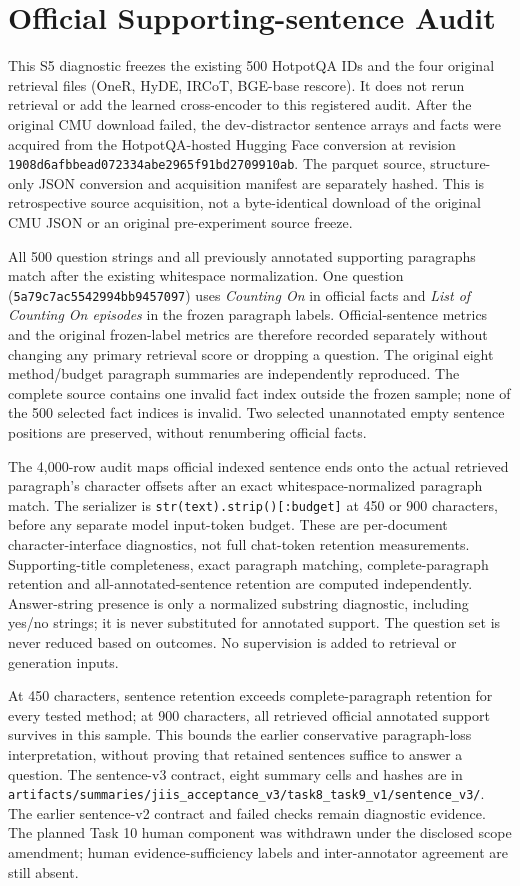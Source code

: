 \documentclass[pdflatex,sn-basic,Numbered]{sn-jnl}
\begin{document}
\section{Official Supporting-sentence Audit}
\label{sec:supp_sentence_audit}
This S5 diagnostic freezes the existing 500 HotpotQA IDs and the four original retrieval files (OneR, HyDE, IRCoT, BGE-base rescore). It does not rerun retrieval or add the learned cross-encoder to this registered audit. After the original CMU download failed, the dev-distractor sentence arrays and facts were acquired from the HotpotQA-hosted Hugging Face conversion at revision \texttt{1908d6afbbead072334abe2965f91bd2709910ab}. The parquet source, structure-only JSON conversion and acquisition manifest are separately hashed. This is retrospective source acquisition, not a byte-identical download of the original CMU JSON or an original pre-experiment source freeze.

All 500 question strings and all previously annotated supporting paragraphs match after the existing whitespace normalization. One question (\texttt{5a79c7ac5542994bb9457097}) uses \emph{Counting On} in official facts and \emph{List of Counting On episodes} in the frozen paragraph labels. Official-sentence metrics and the original frozen-label metrics are therefore recorded separately without changing any primary retrieval score or dropping a question. The original eight method/budget paragraph summaries are independently reproduced. The complete source contains one invalid fact index outside the frozen sample; none of the 500 selected fact indices is invalid. Two selected unannotated empty sentence positions are preserved, without renumbering official facts.

The 4,000-row audit maps official indexed sentence ends onto the actual retrieved paragraph's character offsets after an exact whitespace-normalized paragraph match. The serializer is \texttt{str(text).strip()[:budget]} at 450 or 900 characters, before any separate model input-token budget. These are per-document character-interface diagnostics, not full chat-token retention measurements. Supporting-title completeness, exact paragraph matching, complete-paragraph retention and all-annotated-sentence retention are computed independently. Answer-string presence is only a normalized substring diagnostic, including yes/no strings; it is never substituted for annotated support. The question set is never reduced based on outcomes. No supervision is added to retrieval or generation inputs.

At 450 characters, sentence retention exceeds complete-paragraph retention for every tested method; at 900 characters, all retrieved official annotated support survives in this sample. This bounds the earlier conservative paragraph-loss interpretation, without proving that retained sentences suffice to answer a question. The sentence-v3 contract, eight summary cells and hashes are in \texttt{artifacts/summaries/jiis\_acceptance\_v3/task8\_task9\_v1/sentence\_v3/}. The earlier sentence-v2 contract and failed checks remain diagnostic evidence. The planned Task 10 human component was withdrawn under the disclosed scope amendment; human evidence-sufficiency labels and inter-annotator agreement are still absent.

\FloatBarrier




\end{document}
